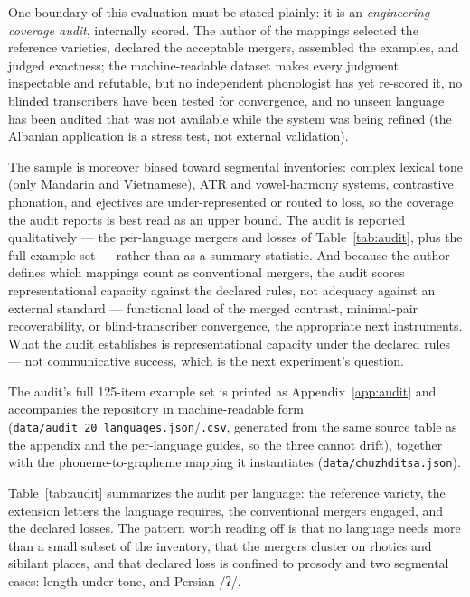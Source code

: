 \documentclass[12pt]{article}
\newcommand{\ph}[1]{{\ipafont/#1/}}
\begin{document}
One boundary of this evaluation must be stated plainly: it is an \emph{engineering coverage audit}, internally scored. The author of the mappings selected the reference varieties, declared the acceptable mergers, assembled the examples, and judged exactness; the machine-readable dataset makes every judgment inspectable and refutable, but no independent phonologist has yet re-scored it, no blinded transcribers have been tested for convergence, and no unseen language has been audited that was not available while the system was being refined (the Albanian application is a stress test, not external validation).

The sample is moreover biased toward segmental inventories: complex lexical tone (only Mandarin and Vietnamese), ATR and vowel-harmony systems, contrastive phonation, and ejectives are under-represented or routed to loss, so the coverage the audit reports is best read as an upper bound. The audit is reported qualitatively — the per-language mergers and losses of Table~\ref{tab:audit}, plus the full example set — rather than as a summary statistic. And because the author defines which mappings count as conventional mergers, the audit scores representational capacity against the declared rules, not adequacy against an external standard — functional load of the merged contrast, minimal-pair recoverability, or blind-transcriber convergence, the appropriate next instruments. What the audit establishes is representational capacity under the declared rules — not communicative success, which is the next experiment's question.

The audit's full 125-item example set is printed as Appendix~\ref{app:audit} and accompanies the repository in machine-readable form (\texttt{data/audit\_20\_languages.json}/\texttt{.csv}, generated from the same source table as the appendix and the per-language guides, so the three cannot drift), together with the phoneme-to-grapheme mapping it instantiates (\texttt{data/chuzhditsa.json}).

Table~\ref{tab:audit} summarizes the audit per language: the reference variety, the extension letters the language requires, the conventional mergers engaged, and the declared losses. The pattern worth reading off is that no language needs more than a small subset of the inventory, that the mergers cluster on rhotics and sibilant places, and that declared loss is confined to prosody and two segmental cases: length under tone, and Persian \ph{ʔ}.
\end{document}
